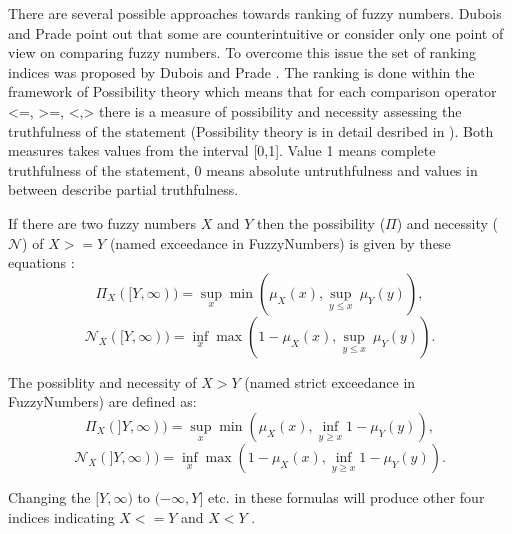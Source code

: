 \documentclass[11pt]{article}\usepackage[]{graphicx}\usepackage[]{color}
\newcommand{\package}[1]{\textsf{#1}\xspace}
\begin{document}
There are several possible approaches towards ranking of fuzzy numbers. Dubois and Prade \cite{DuboisPrade1983:rankfn} point out that some are counterintuitive or consider only one point of view on comparing fuzzy numbers. To overcome this issue the set of ranking indices was proposed by Dubois and Prade \cite{DuboisPrade1983:rankfn}. The ranking is done within the framework of Possibility theory which means that for each comparison operator <=, >=, <,> there is a measure of possibility and necessity assessing the truthfulness of the statement (Possibility theory is in detail desribed in \cite{DuboisPrade1986:possbook}). Both measures takes values from the interval [0,1]. Value 1 means complete truthfulness of the statement, 0 means absolute untruthfulness and values in between describe partial truthfulness.

If there are two fuzzy numbers $X$ and $Y$ then the possibility ($\Pi$) and necessity ($\mathcal{N}$) of $X>=Y$ (named exceedance in \package{FuzzyNumbers}) is given by these equations \cite{DuboisPrade1983:rankfn}:
\begin{equation}
\Pi_{X}( [ Y,\infty )) = \underset{x}{\sup} \min ( \mu_{X}(x), \underset{y \leq x}{\sup} \ \mu_{Y} (y) ),
\end{equation}
\begin{equation}
\mathcal{N}_{X}( [ Y,\infty )) = \underset{x}{\inf} \max ( 1 - \mu_{X}(x), \underset{y \leq x}{\sup} \ \mu_{Y} (y) ).
\end{equation}

The possiblity and necessity of $X>Y$ (named strict exceedance in \package{FuzzyNumbers}) are defined as\cite{DuboisPrade1983:rankfn}:
\begin{equation}
\Pi_{X}( ] Y,\infty )) = \underset{x}{\sup} \min ( \mu_{X}(x), \underset{y \geq x}{\inf} 1 - \mu_{Y} (y) ),
\end{equation}
\begin{equation}
\mathcal{N}_{X}( ] Y,\infty )) = \underset{x}{\inf} \max ( 1-\mu_{X}(x), \underset{y \geq x}{\inf} 1 - \mu_{Y} (y) ).
\end{equation}

Changing the $[ Y,\infty )$ to $( - \infty, Y ]$ etc. in these formulas will produce other four indices indicating $X<=Y$ and $X<Y$ \cite{DuboisPrade1983:rankfn,DuboisPrade1986:possbook}.
\end{document}
